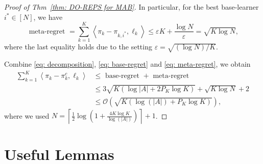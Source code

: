 \documentclass[11pt]{article}
\begin{document}
\begin{proof}[Proof of Thm~\ref{thm: DO-REPS for MAB}]
    In particular, for the best base-learner $i^* \in[N]$, we have
    \begin{equation}
        \label{eq: meta-regret}
        \text { meta-regret }=\sum_{k=1}^K\left\langle \pi_k-\pi_{k, i^*}, \ell_k\right\rangle \leq \varepsilon K+\frac{\log N}{\varepsilon}=\sqrt{K \log N},
    \end{equation}
    where the last equality holds due to the setting $\varepsilon=\sqrt{(\log N) /K}$.
    
    Combine \eqref{eq: decomposition}, \eqref{eq: base-regret} and \eqref{eq: meta-regret}, we obtain 
    \[
        \begin{aligned}
            \sum_{k=1}^K\left\langle \pi_k-{\pi_k^{c}}, \ell_k\right\rangle & \leq \text { base-regret }+\text { meta-regret } \\
            & \leq 3 \sqrt{K\left( \log |A|+2 P_K\log K\right)}+\sqrt{K\log N}+2 \\
            & \leq \mathcal{O}\left(\sqrt{K\left(\log (| A| )+P_K \log K\right)}\right),
            \end{aligned}
    \]
    where we used $N=\left\lceil\frac{1}{2} \log \left(1+\frac{4 K \log K}{\log (|A| )}\right)\right\rceil+1$. 
    \end{proof}


\section{Useful Lemmas}
\end{document}
